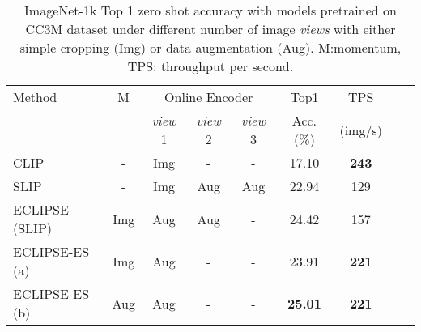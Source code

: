\begin{table}[t!]
    \tabcolsep=0.1cm
  \centering
  \footnotesize
  \begin{tabular}{l | c c c c c c c c }
    \toprule
    Method  & M & \multicolumn{3}{c}{Online Encoder} & Top1 & TPS\\ 
            &  & \textit{view} 1 & \textit{view} 2 & \textit{view} 3 & Acc. (\%)& (img/s)\\ \midrule
    CLIP & - & Img & - & - & 17.10 & \textbf{243} \\
    SLIP & - & Img & Aug & Aug & 22.94 & 129\\
    ECLIPSE (SLIP) & Img & Aug & Aug & - &  24.42 & 157\\
    ECLIPSE-ES (a) & Img & Aug & -  & - & 23.91 & \textbf{221}\\
    ECLIPSE-ES (b) & Aug & Aug & - & - & \textbf{25.01} & \textbf{221}\\ %
    \bottomrule
  \end{tabular}
  \caption{
  ImageNet-1k Top 1 zero shot accuracy with models pretrained on CC3M dataset under different number of image \textit{views} with either simple cropping (Img) or data augmentation (Aug). 
  M:momentum, TPS: throughput per second.
  }
  \label{tab:ssl}
\end{table}